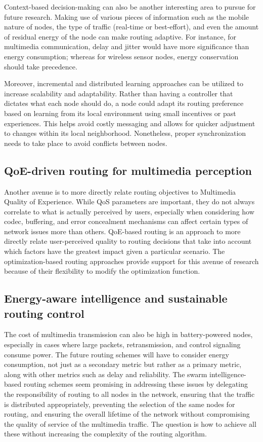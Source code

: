 \documentclass[12pt]{article}
\begin{document}
    Context-based decision-making can also be another interesting area to pursue for future research. Making use of various pieces of information such as the mobile nature of nodes, the type of traffic (real-time or best-effort), and even the amount of residual energy of the node can make routing adaptive. For instance, for multimedia communication, delay and jitter would have more significance than energy consumption; whereas for wireless sensor nodes, energy conservation should take precedence.

    Moreover, incremental and distributed learning approaches can be utilized to increase scalability and adaptability. Rather than having a controller that dictates what each node should do, a node could adapt its routing preference based on learning from its local environment using small incentives or past experiences. This helps avoid costly messaging and allows for quicker adjustment to changes within its local neighborhood. Nonetheless, proper synchronization needs to take place to avoid conflicts between nodes.
    
    \subsection{QoE-driven routing for multimedia perception}
    Another avenue is to more directly relate routing objectives to Multimedia Quality of Experience. While QoS parameters are important, they do not always correlate to what is actually perceived by users, especially when considering how codec, buffering, and error concealment mechanisms can affect certain types of network issues more than others. QoE-based routing is an approach to more directly relate user-perceived quality to routing decisions that take into account which factors have the greatest impact given a particular scenario. The optimization-based routing approaches provide support for this avenue of research because of their flexibility to modify the optimization function. 
    \subsection{Energy-aware intelligence and sustainable routing control}
	
The cost of multimedia transmission can also be high in battery-powered nodes, especially in cases where large packets, retransmission, and control signaling consume power. The future routing schemes will have to consider energy consumption, not just as a secondary metric but rather as a primary metric, along with other metrics such as delay and reliability. The swarm intelligence-based routing schemes seem promising in addressing these issues by delegating the responsibility of routing to all nodes in the network, ensuring that the traffic is distributed appropriately, preventing the selection of the same nodes for routing, and ensuring the overall lifetime of the network without compromising the quality of service of the multimedia traffic. The question is how to achieve all these without increasing the complexity of the routing algorithm.
\end{document}
